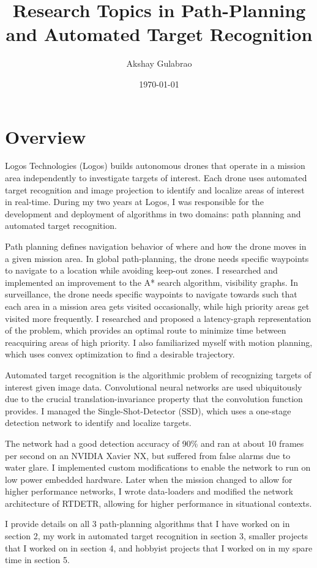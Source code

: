 \documentclass[12pt]{article}
\title{Research Topics in Path-Planning and Automated Target Recognition}
\author{Akshay Gulabrao}
\date{\today}
\begin{document}
\maketitle
\section{Overview}
Logos Technologies (Logos) builds autonomous drones that operate in a mission area independently to investigate targets of interest.
Each drone uses automated target recognition and image projection to identify and localize areas of interest in real-time.
During my two years at Logos, I was responsible for the development and deployment of algorithms in two domains: path planning and automated target recognition.

Path planning defines navigation behavior of where and how the drone moves in a given mission area.
In global path-planning, the drone needs specific waypoints to navigate to a location while avoiding keep-out zones.
I researched and implemented an improvement to the A* search algorithm, visibility graphs.
In surveillance, the drone needs specific waypoints to navigate towards such that each area in a mission area gets visited occasionally, while high priority areas get visited more frequently.
I researched and proposed a latency-graph representation of the problem, which provides an optimal route to minimize time between reacquiring areas of high priority.
I also familiarized myself with motion planning, which uses convex optimization to find a desirable trajectory.

Automated target recognition is the algorithmic problem of recognizing targets of interest given image data.
Convolutional neural networks are used ubiquitously due to the crucial translation-invariance property that the convolution function provides.
I managed the Single-Shot-Detector (SSD), which uses a one-stage detection network to identify and localize targets.

The network had a good detection accuracy of 90\% and ran at about 10 frames per second on an NVIDIA Xavier NX, but suffered from false alarms due to water glare.
I implemented custom modifications to enable the network to run on low power embedded hardware.
Later when the mission changed to allow for higher performance networks, I wrote data-loaders and modified the network architecture of RTDETR, allowing for higher performance in situational contexts.

I provide details on all 3 path-planning algorithms that I have worked on in section 2, my work in automated target recognition in section 3, smaller projects that I worked on in section 4, and hobbyist projects that I worked on in my spare time in section 5.
\end{document}
